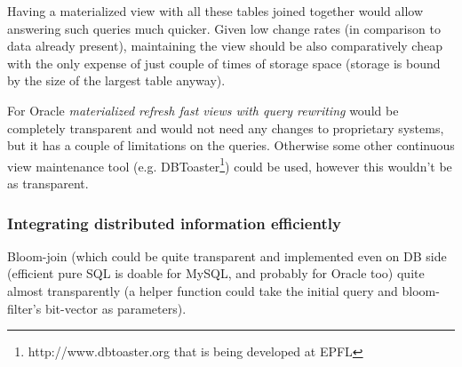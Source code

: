 Having a materialized view with all these tables joined together would allow answering such queries much quicker. Given low change rates (in comparison to data already present), maintaining the view should be also comparatively cheap with the only expense of just couple of times of storage space (storage is bound by the size of the largest table anyway).

For Oracle \textit{materialized refresh fast views with query rewriting} would be completely transparent and would not need any changes to proprietary systems, but it has a couple of limitations on the queries\cite{Oracle11}. Otherwise some other continuous view maintenance tool (e.g. DBToaster\footnote{http://www.dbtoaster.org that is being developed at EPFL}) could be used, however this wouldn't be as transparent.


\subsubsection*{Integrating distributed information efficiently}
Bloom-join (which could be quite transparent and implemented even on DB side (efficient pure SQL is doable for MySQL, and probably for Oracle too) quite almost transparently (a helper function could take the initial query and bloom-filter's bit-vector as parameters). 